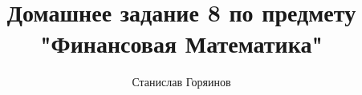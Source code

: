 

\date{}
\title{Домашнее задание 8 по предмету "Финансовая Математика"}
\author{Станислав Горяинов}


\maketitle




